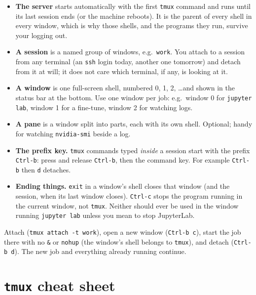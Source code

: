 \documentclass[11pt]{article}
\newcommand{\code}[1]{\texttt{#1}}
\begin{document}
\begin{itemize}
  \item \textbf{The server} starts automatically with the first \code{tmux} command and runs
    until its last session ends (or the machine reboots). It is the parent of every shell
    in every window, which is why those shells, and the programs they run, survive your
    logging out.
  \item \textbf{A session} is a named group of windows, e.g.\ \code{work}. You attach to a
    session from any terminal (an \code{ssh} login today, another one tomorrow) and detach
    from it at will; it does not care which terminal, if any, is looking at it.
  \item \textbf{A window} is one full-screen shell, numbered 0, 1, 2, \ldots and shown in the
    status bar at the bottom. Use one window per job: e.g.\ window 0 for
    \code{jupyter lab}, window 1 for a fine-tune, window 2 for watching logs.
  \item \textbf{A pane} is a window split into parts, each with its own shell. Optional;
    handy for watching \code{nvidia-smi} beside a log.
  \item \textbf{The prefix key.} \code{tmux} commands typed \emph{inside} a session start with
    the prefix \code{Ctrl-b}: press and release \code{Ctrl-b}, then the command key. For
    example \code{Ctrl-b} then \code{d} detaches.
  \item \textbf{Ending things.} \code{exit} in a window's shell closes that window (and the
    session, when its last window closes). \code{Ctrl-c} stops the program running in the
    current window, not \code{tmux}. Neither should ever be used in the window running
    \code{jupyter lab} unless you mean to stop JupyterLab.
\end{itemize}

\begin{keyidea}
Attach (\code{tmux attach -t work}), open a new window (\code{Ctrl-b c}), start the job
there with no \code{\&} or \code{nohup} (the window's shell belongs to \code{tmux}), and detach
(\code{Ctrl-b d}). The new job and everything already running continue.
\end{keyidea}

\section{\texttt{tmux} cheat sheet}
\label{sec:cheat}
\end{document}
